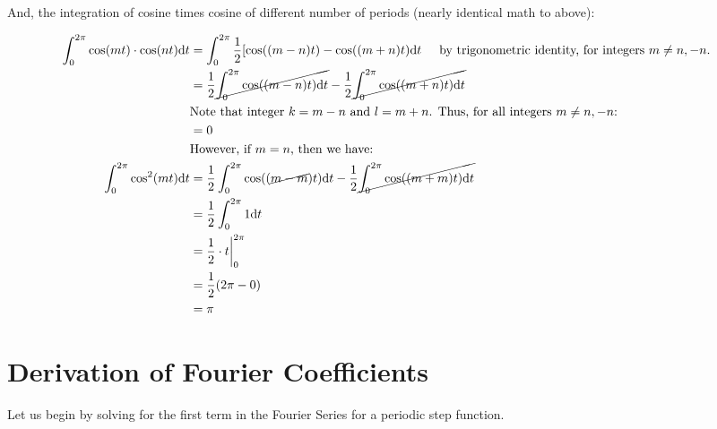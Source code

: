 \documentclass[10pt]{article} %
\begin{document}
And, the integration of cosine times cosine of different number of periods (nearly identical math to above):

\begin{align}
    \int_0^{2\pi} \cos(mt) \cdot \cos(nt) \mathrm{d}t &=\int_0^{2\pi}\frac12[\cos((m-n)t) - \cos((m+n)t) \mathrm{d}t \text{\hspace{0.5cm}by trigonometric identity, for integers $m \neq n, -n$.}&\\
    & =\frac12\cancel{\int_0^{2\pi}\cos((m-n)t)\mathrm{d}t} - \frac12\cancel{\int_0^{2\pi}\cos((m+n)t)\mathrm{d}t}\\
    & \text{Note that integer $k = m-n$ and $l = m+n$. Thus, for all integers $m \neq n, -n$:} &\\
    & = 0 \\
    & \text{However, if $m = n$, then we have:}\\
    \int_0^{2\pi} \cos^2(mt)\mathrm{d}t & = \frac12\int_0^{2\pi}\cos((\cancel{m-m})t)\mathrm{d}t - \frac12\cancel{\int_0^{2\pi}\cos((m+m)t)\mathrm{d}t}\\
    & = \frac12\int_0^{2\pi}1\mathrm{d}t\\
    & = \frac12 \cdot t \bigg\rvert_0^{2\pi} \\
    & = \frac12 (2\pi - 0) \\
    & = \pi
\end{align}

\section*{Derivation of Fourier Coefficients} %

Let us begin by solving for the first term in the Fourier Series for a periodic step function.
\end{document}
